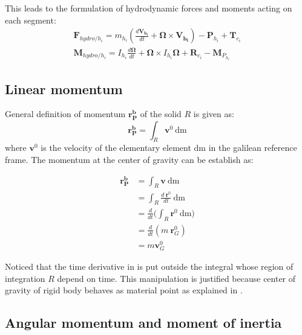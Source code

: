 \documentclass{article}
\begin{document}
This leads to the formulation of hydrodynamic forces and moments acting on each segment:
\begin{equation}
\begin{array}{l}
\displaystyle \mathbf{F}_{hydro/h_i}  = m_{h_i} (\frac{d\mathbf{V_{h_i}}}{dt}+\mathbf{\Omega} \times \mathbf{V_{h_i}}) -  \mathbf{P}_{h_i}  + \mathbf{T}_{c_i}  \\
\displaystyle  \mathbf{M}_{hydro/h_i} =  I_{h_i}\frac{d\mathbf{\Omega}}{dt}+\mathbf{\Omega} \times  I_{h_i}\mathbf{\Omega}  +  \mathbf{R}_{c_i} - \mathbf{M}_{P_{h_i}}
\end{array}
\end{equation}






\subsection{Linear momentum}

General definition of momentum $\mathbf{r^b_P}$ of the solid $R$ is given as:
\begin{equation}
\mathbf{r^b_P} = \int_{R} \textbf{v}^0 \: \text{dm}
\end{equation}
where $ \textbf{v} ^0$ is the velocity of the elementary element $\text{dm}$ in the galilean reference frame.
The momentum at the center of gravity can be establish as:

\begin{align} 
\mathbf{r^b_P} &= \int_{R} \textbf{v}\: \text{dm} \\
& = \int_{R} \frac{d \: \textbf{r}^0}{dt} \:  \text{dm}\\ \label{MomentumTemp}
& =  \frac{d}{dt} \bigg( \int_{R} \textbf{r}^0 \:  \text{dm}  \bigg) \\ 
& = \frac{d}{dt} (m \: \textbf{r}_G^0) \\
&= m \textbf{v}_G^0 \label{Momentum}
\end{align}

Noticed that the time derivative in is put outside the integral whose region of integration $R$ depend on time. This manipulation is justified because center of gravity of rigid body behaves as material point as explained in \cite{Oliver,Casey}. 


\subsection{Angular momentum and moment of inertia}
\end{document}
